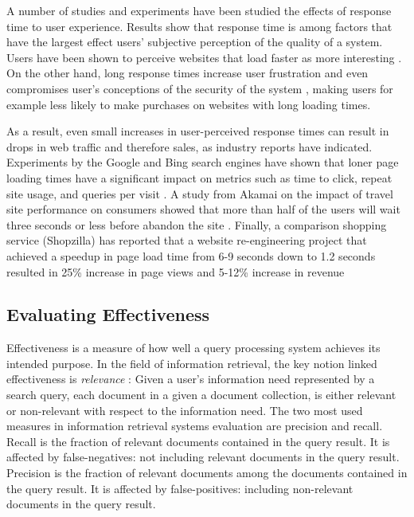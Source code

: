 A number of studies and experiments have been studied the effects of response time to user experience.
Results show that response time is among factors that have the largest effect users' subjective perception of the
quality of a system.
Users have been shown to perceive websites that load faster as more interesting \cite{ramsay/retrievaltimesinvestigation}.
On the other hand, long response times increase user frustration \cite{ceaparu:userfrustration} and even compromises
user's conceptions of the security of the system \cite{bouch:qualityeyebeholder}, making users for example less likely to
make purchases on websites with long loading times.

As a result, even small increases in user-perceived response times can result in drops in web traffic and
therefore sales, as industry reports have indicated.
Experiments by the Google and Bing search engines have shown that loner page loading times have a significant impact on
metrics such as time to click, repeat site usage, and queries per visit \cite{schurman:rerformanceuserimpact}.
A study from Akamai on the impact of travel site performance on consumers showed that more than half of the users will
wait three seconds or less before abandon the site \cite{akamai:travelsiteperformance}.
Finally, a comparison shopping service (Shopzilla) has reported that a website re-engineering project that achieved a
speedup in page load time from 6-9 seconds down to 1.2 seconds resulted in 25\% increase in page views and 5-12\%
increase in revenue \cite{dixon:shopzillasiteredo}

\subsection{Evaluating Effectiveness}

Effectiveness is a measure of how well a query processing system achieves its intended purpose.
In the field of information retrieval, the key notion linked effectiveness is \textit{relevance}
\cite{buttcher:informationretrieval}:
Given a user's information need represented by a search query, each document in a given a document collection, is either
relevant or non-relevant with respect to the information need.
The two most used measures in information retrieval systems evaluation are precision and recall.
Recall is the fraction of relevant documents contained in the query result.
It is affected by false-negatives: not including relevant documents in the query result.
Precision is the fraction of relevant documents among the documents contained in the query result.
It is affected by false-positives: including non-relevant documents in the query result.

